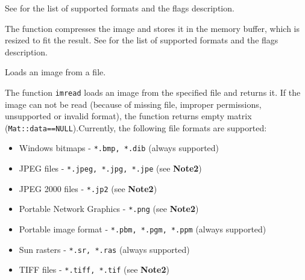 See  for the list of supported formats and the flags description. 


\begin{description}
\end{description}

The function compresses the image and stores it in the memory buffer, which is resized to fit the result.
See  for the list of supported formats and the flags description.


Loads an image from a file.


\begin{description}
\begin{description}
\end{description}
\end{description}

The function \texttt{imread} loads an image from the specified file and returns it. If the image can not be read (because of missing file, improper permissions, unsupported or invalid format), the function returns empty matrix (\texttt{Mat::data==NULL}).Currently, the following file formats are supported:
\begin{itemize}
\item Windows bitmaps - \texttt{*.bmp, *.dib} (always supported)
\item JPEG files - \texttt{*.jpeg, *.jpg, *.jpe} (see \textbf{Note2})
\item JPEG 2000 files - \texttt{*.jp2} (see \textbf{Note2})
\item Portable Network Graphics - \texttt{*.png}  (see \textbf{Note2})
\item Portable image format - \texttt{*.pbm, *.pgm, *.ppm} (always supported)
\item Sun rasters - \texttt{*.sr, *.ras} (always supported)
\item TIFF files - \texttt{*.tiff, *.tif}  (see \textbf{Note2})
\end{itemize}

